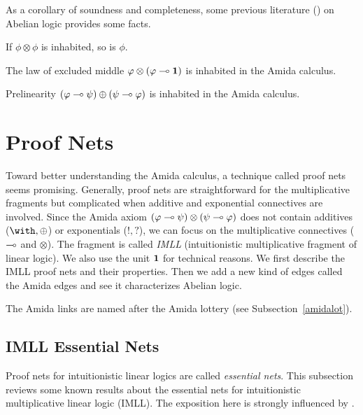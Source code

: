 As a corollary of soundness and completeness,
some previous literature (\citet{meyer-slaney-1989,casari1989}) on
Abelian logic provides some facts.
\begin{corollary}
 If $\phi\otimes\phi$ is inhabited, so is $\phi$.
\end{corollary}
\begin{corollary}
 The law of excluded middle $\varphi\otimes(\varphi\multimap \mathbf{1})$ is inhabited
 in the Amida calculus.
\end{corollary}
\begin{corollary}
 Prelinearity $(\varphi\multimap\psi)\oplus(\psi\multimap\varphi)$ is
 inhabited in the Amida calculus.
\end{corollary}

\section{Proof Nets}
\label{sec:proofnets}

Toward better understanding the Amida calculus, a technique called proof nets
seems promising.
Generally, proof nets are straightforward for the multiplicative
fragments but complicated when additive and exponential connectives are
involved.
Since the Amida axiom $(\varphi\multimap\psi)\otimes(\psi\multimap\varphi)$
does not contain additives ($\with,\oplus$) or exponentials ($!,?$),
we can focus on the multiplicative connectives ($\multimap$ and $\otimes$).
The fragment is called \textit{IMLL} (intuitionistic multiplicative fragment of
linear logic).  We also use the unit $\mathbf{1}$ for technical reasons.
We first describe the IMLL proof nets and their properties.
Then we add a new kind of edges called the Amida edges and see it
characterizes Abelian logic.

The Amida links are named after the Amida lottery (see
Subsection~\ref{amidalot}).

\subsection{IMLL Essential Nets}

Proof nets for intuitionistic linear logics are called \textit{essential
nets}.
This subsection reviews some known results about the essential
nets for
intuitionistic multiplicative linear logic
(IMLL). The exposition here is strongly
influenced by \citet{murawski2003}.

